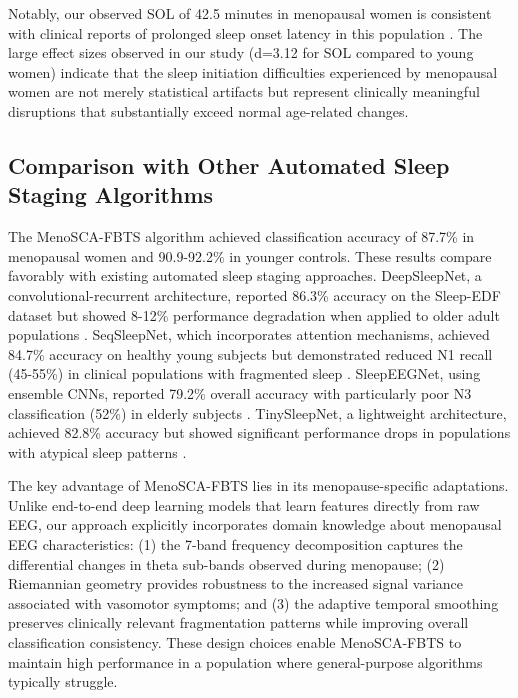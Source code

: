 \documentclass[ASNA,twocolumn]{USG}
\begin{document}
Notably, our observed SOL of 42.5 minutes in menopausal women is consistent with clinical reports of prolonged sleep onset latency in this population \cite{Baker2007}. The large effect sizes observed in our study (d=3.12 for SOL compared to young women) indicate that the sleep initiation difficulties experienced by menopausal women are not merely statistical artifacts but represent clinically meaningful disruptions that substantially exceed normal age-related changes.

\subsection{Comparison with Other Automated Sleep Staging Algorithms}

The MenoSCA-FBTS algorithm achieved classification accuracy of 87.7\% in menopausal women and 90.9-92.2\% in younger controls. These results compare favorably with existing automated sleep staging approaches. DeepSleepNet, a convolutional-recurrent architecture, reported 86.3\% accuracy on the Sleep-EDF dataset but showed 8-12\% performance degradation when applied to older adult populations \cite{Supratak2017, Chambon2018}. SeqSleepNet, which incorporates attention mechanisms, achieved 84.7\% accuracy on healthy young subjects but demonstrated reduced N1 recall (45-55\%) in clinical populations with fragmented sleep \cite{Phan2019}. SleepEEGNet, using ensemble CNNs, reported 79.2\% overall accuracy with particularly poor N3 classification (52\%) in elderly subjects \cite{Supratak2018}. TinySleepNet, a lightweight architecture, achieved 82.8\% accuracy but showed significant performance drops in populations with atypical sleep patterns \cite{Perslev2021}.

The key advantage of MenoSCA-FBTS lies in its menopause-specific adaptations. Unlike end-to-end deep learning models that learn features directly from raw EEG, our approach explicitly incorporates domain knowledge about menopausal EEG characteristics: (1) the 7-band frequency decomposition captures the differential changes in theta sub-bands observed during menopause; (2) Riemannian geometry provides robustness to the increased signal variance associated with vasomotor symptoms; and (3) the adaptive temporal smoothing preserves clinically relevant fragmentation patterns while improving overall classification consistency. These design choices enable MenoSCA-FBTS to maintain high performance in a population where general-purpose algorithms typically struggle.
\end{document}
